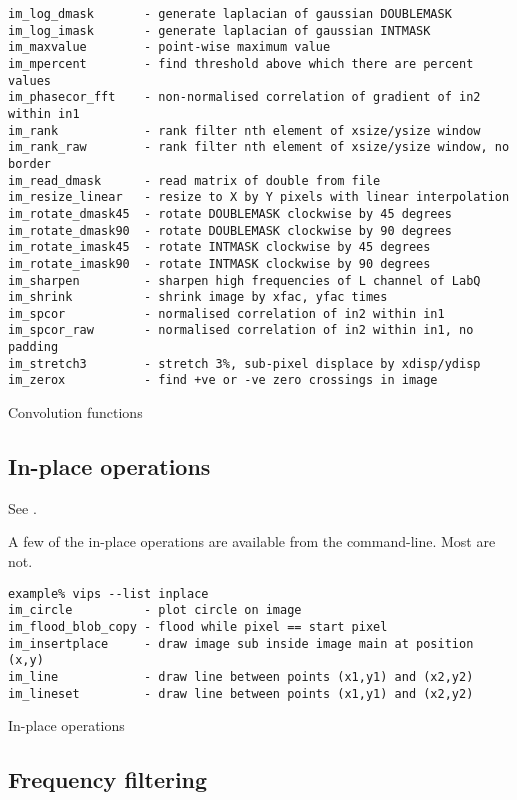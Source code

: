 \begin{fig2}
\begin{verbatim}
im_log_dmask       - generate laplacian of gaussian DOUBLEMASK
im_log_imask       - generate laplacian of gaussian INTMASK
im_maxvalue        - point-wise maximum value
im_mpercent        - find threshold above which there are percent values
im_phasecor_fft    - non-normalised correlation of gradient of in2 within in1
im_rank            - rank filter nth element of xsize/ysize window
im_rank_raw        - rank filter nth element of xsize/ysize window, no border
im_read_dmask      - read matrix of double from file
im_resize_linear   - resize to X by Y pixels with linear interpolation
im_rotate_dmask45  - rotate DOUBLEMASK clockwise by 45 degrees
im_rotate_dmask90  - rotate DOUBLEMASK clockwise by 90 degrees
im_rotate_imask45  - rotate INTMASK clockwise by 45 degrees
im_rotate_imask90  - rotate INTMASK clockwise by 90 degrees
im_sharpen         - sharpen high frequencies of L channel of LabQ
im_shrink          - shrink image by xfac, yfac times
im_spcor           - normalised correlation of in2 within in1
im_spcor_raw       - normalised correlation of in2 within in1, no padding
im_stretch3        - stretch 3%, sub-pixel displace by xdisp/ydisp
im_zerox           - find +ve or -ve zero crossings in image
\end{verbatim}
\caption{Convolution functions}
\label{fg:convolution}
\end{fig2}

\subsection{In-place operations}
\label{sec:inplace}

See .

A few of the in-place operations are available from the command-line. Most are
not. 

\begin{fig2}
\begin{verbatim}
example% vips --list inplace
im_circle          - plot circle on image
im_flood_blob_copy - flood while pixel == start pixel
im_insertplace     - draw image sub inside image main at position (x,y)
im_line            - draw line between points (x1,y1) and (x2,y2)
im_lineset         - draw line between points (x1,y1) and (x2,y2)
\end{verbatim}
\caption{In-place operations}
\label{fg:inplace}
\end{fig2}

\subsection{Frequency filtering}

